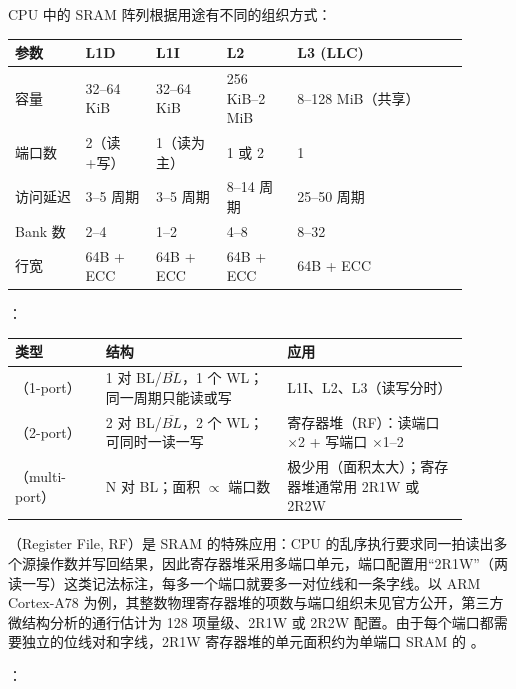 
CPU 中的 SRAM 阵列根据用途有不同的组织方式：

\begin{longtable}{L{0.14\linewidth}L{0.14\linewidth}L{0.14\linewidth}L{0.14\linewidth}L{0.34\linewidth}}
\toprule
参数 & L1D & L1I & L2 & L3 (LLC) \\
\midrule
容量 & 32--64 KiB & 32--64 KiB & 256 KiB--2 MiB & 8--128 MiB（共享） \\\tablerowrule
端口数 & 2（读+写） & 1（读为主） & 1 或 2 & 1 \\\tablerowrule
访问延迟 & 3--5 周期 & 3--5 周期 & 8--14 周期 & 25--50 周期 \\\tablerowrule
Bank 数 & 2--4 & 1--2 & 4--8 & 8--32 \\\tablerowrule
行宽 & 64B + ECC & 64B + ECC & 64B + ECC & 64B + ECC \\
\bottomrule
\end{longtable}

：

\begin{longtable}{L{0.18\linewidth}L{0.36\linewidth}L{0.36\linewidth}}
\toprule
类型 & 结构 & 应用 \\
\midrule
{}（1-port） & 1 对 BL/$\overline{BL}$，1 个 WL；同一周期只能读或写 & L1I、L2、L3（读写分时） \\\tablerowrule
{}（2-port） & 2 对 BL/$\overline{BL}$，2 个 WL；可同时一读一写 & 寄存器堆（RF）：读端口 $\times$2 + 写端口 $\times$1--2 \\\tablerowrule
{}（multi-port） & N 对 BL；面积 $\propto$ 端口数 & 极少用（面积太大）；寄存器堆通常用 2R1W 或 2R2W \\
\bottomrule
\end{longtable}

（Register File, RF）是 SRAM 的特殊应用：CPU 的乱序执行要求同一拍读出多个源操作数并写回结果，因此寄存器堆采用多端口单元，端口配置用“2R1W”（两读一写）这类记法标注，每多一个端口就要多一对位线和一条字线。以 ARM Cortex-A78 为例，其整数物理寄存器堆的项数与端口组织未见官方公开，第三方微结构分析的通行估计为 128 项量级、2R1W 或 2R2W 配置。由于每个端口都需要独立的位线对和字线，2R1W 寄存器堆的单元面积约为单端口 SRAM 的 。

：

